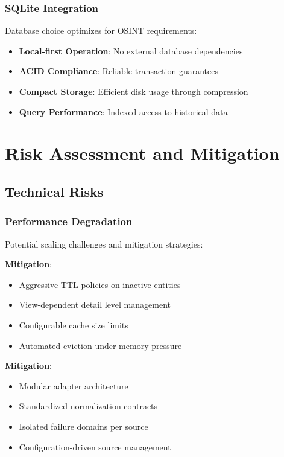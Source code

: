 \documentclass[12pt,a4paper]{article}
\begin{document}
\subsubsection{SQLite Integration}
Database choice optimizes for OSINT requirements:

\begin{itemize}
\item \textbf{Local-first Operation}: No external database dependencies
\item \textbf{ACID Compliance}: Reliable transaction guarantees
\item \textbf{Compact Storage}: Efficient disk usage through compression
\item \textbf{Query Performance}: Indexed access to historical data
\end{itemize}

\section{Risk Assessment and Mitigation}

\subsection{Technical Risks}

\subsubsection{Performance Degradation}
Potential scaling challenges and mitigation strategies:

\begin{tcolorbox}[colback=red!10,colframe=red,title=Risk: Memory Growth with Entity Count]
\textbf{Mitigation}: 
\begin{itemize}
\item Aggressive TTL policies on inactive entities
\item View-dependent detail level management
\item Configurable cache size limits
\item Automated eviction under memory pressure
\end{itemize}
\end{tcolorbox}

\begin{tcolorbox}[colback=orange!10,colframe=orange,title=Risk: Source Integration Complexity]
\textbf{Mitigation}:
\begin{itemize}
\item Modular adapter architecture
\item Standardized normalization contracts
\item Isolated failure domains per source
\item Configuration-driven source management
\end{itemize}
\end{tcolorbox}
\end{document}
